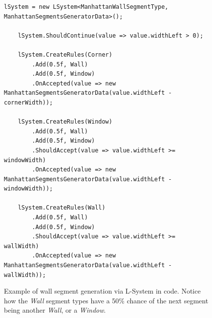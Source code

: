 \begin{figure}[H]
  \begin{lstlisting}[]
    lSystem = new LSystem<ManhattanWallSegmentType, ManhattanSegmentsGeneratorData>();

    lSystem.ShouldContinue(value => value.widthLeft > 0);

    lSystem.CreateRules(Corner)
        .Add(0.5f, Wall)
        .Add(0.5f, Window)
        .OnAccepted(value => new ManhattanSegmentsGeneratorData(value.widthLeft - cornerWidth));

    lSystem.CreateRules(Window)
        .Add(0.5f, Wall)
        .Add(0.5f, Window)
        .ShouldAccept(value => value.widthLeft >= windowWidth)
        .OnAccepted(value => new ManhattanSegmentsGeneratorData(value.widthLeft - windowWidth));

    lSystem.CreateRules(Wall)
        .Add(0.5f, Wall)
        .Add(0.5f, Window)
        .ShouldAccept(value => value.widthLeft >= wallWidth)
        .OnAccepted(value => new ManhattanSegmentsGeneratorData(value.widthLeft - wallWidth));
  \end{lstlisting}
  \caption{Example of wall segment generation via L-System in code. Notice how the \textit{Wall} segment types have a 50\% chance of the next segment being another \textit{Wall}, or a \textit{Window}.}
  \label{fig:lsystem_example}
\end{figure}
